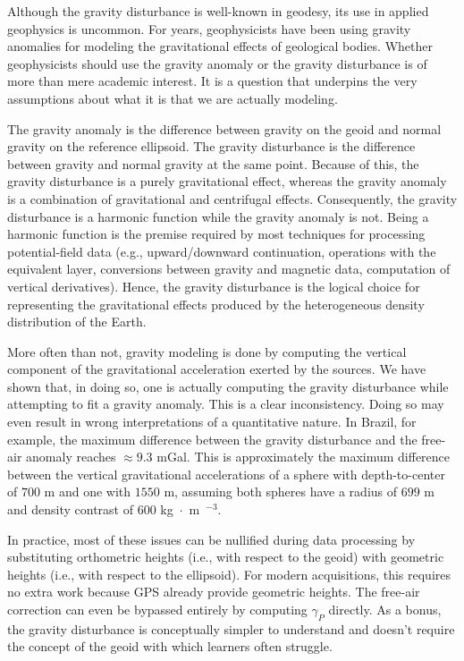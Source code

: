 \documentclass[paper,twocolumn,twoside]{geophysics}
\begin{document}
Although the gravity disturbance is well-known in geodesy,
its use in applied geophysics is uncommon.
For years, geophysicists have been using gravity anomalies for modeling
the gravitational effects of geological bodies.
Whether geophysicists should use the gravity anomaly or the gravity disturbance
is of more than mere academic interest.
It is a question that underpins the very assumptions about what it is that we
are actually modeling.

The gravity anomaly is the difference between
gravity on the geoid and normal gravity on the reference ellipsoid.
The gravity disturbance is the difference between gravity and normal gravity at
the same point.
Because of this, the gravity disturbance is a purely gravitational effect,
whereas the gravity anomaly is a combination of gravitational and centrifugal
effects.
Consequently, the gravity disturbance is a harmonic function while the
gravity anomaly is not.
Being a harmonic function is the premise required by most techniques for
processing potential-field data
(e.g., upward/downward continuation, operations with the equivalent layer,
conversions between gravity and magnetic data, computation of vertical
derivatives).
Hence, the gravity disturbance is the logical choice for
representing the gravitational effects produced by the heterogeneous density
distribution of the Earth.

More often than not, gravity modeling is done by computing the
vertical component of the gravitational acceleration exerted by the sources.
We have shown that, in doing so, one is actually computing the gravity
disturbance while attempting to fit a gravity anomaly.
This is a clear inconsistency.
Doing so may even result in wrong interpretations of a quantitative nature.
In Brazil, for example, the maximum difference
between the gravity disturbance and the free-air anomaly reaches $\approx 9.3$ mGal.
This is approximately the maximum difference between the vertical gravitational
accelerations of a sphere with depth-to-center of $700$ m and one with $1550$ m,
assuming both spheres have a radius of $699$ m and density contrast of
$600$ kg~$\cdot$~m~$^{-3}$.

In practice, most of these issues can be nullified during data processing by
substituting orthometric heights (i.e., with respect to the geoid) with
geometric heights (i.e., with respect to the ellipsoid).
For modern acquisitions, this requires no extra work because GPS already
provide geometric heights.
The free-air correction can even be bypassed entirely by computing $\gamma_P$
directly.
As a bonus, the gravity disturbance is conceptually simpler to understand and
doesn't require the concept of the geoid with which learners often struggle.
\end{document}
